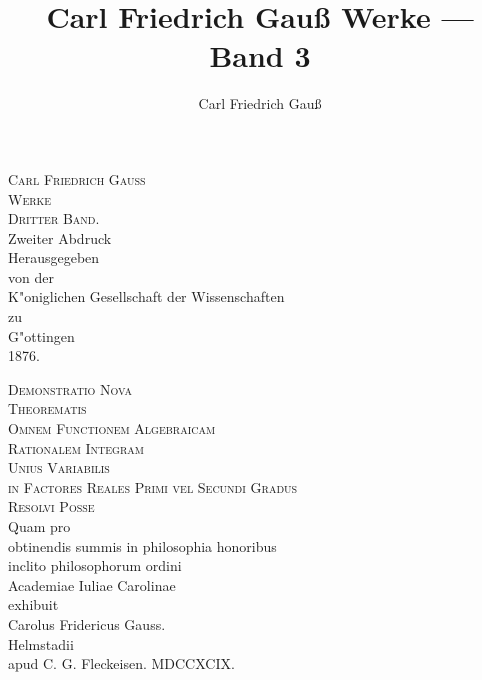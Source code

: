\documentclass[12pt,a4paper]{article}
\title{Carl Friedrich Gau\ss{} Werke --- Band 3}
\author{Carl Friedrich Gau\ss}
\date{}
\begin{document}
\maketitle
\thispagestyle{empty}

\clearpage
\setcounter{page}{1}

\begin{otherlanguage}{ngerman}
\begin{center}
\vspace*{3cm}
{\Huge\scshape Carl Friedrich Gau\ss}\\[0.5cm]
{\LARGE\scshape Werke}\\[1cm]
{\Large\scshape Dritter Band.}\\[2cm]
{\large Zweiter Abdruck}\\[0.5cm]
{\large Herausgegeben}\\[0.3cm]
{\large von der}\\[0.3cm]
{\large K"oniglichen Gesellschaft der Wissenschaften}\\[0.3cm]
{\large zu}\\[0.3cm]
{\large G"ottingen}\\[1cm]
{\large 1876.}
\end{center}
\end{otherlanguage}

\clearpage

\begin{otherlanguage}{latin}
\begin{center}
\vspace*{1cm}
{\Large\scshape Demonstratio Nova\\[0.3cm]
Theorematis\\[0.5cm]
Omnem Functionem Algebraicam\\[0.3cm]
Rationalem Integram\\[0.3cm]
Unius Variabilis\\[0.5cm]
in Factores Reales Primi vel Secundi Gradus\\[0.3cm]
Resolvi Posse}\\[1.5cm]
{\large Quam pro\\[0.3cm]
obtinendis summis in philosophia honoribus\\[0.3cm]
inclito philosophorum ordini\\[0.3cm]
Academiae Iuliae Carolinae\\[0.3cm]
exhibuit}\\[1cm]
{\large Carolus Fridericus Gauss.}\\[1cm]
{\normalsize Helmstadii\\[0.3cm]
apud C. G. Fleckeisen. MDCCXCIX.}
\end{center}
\end{otherlanguage}
\end{document}
